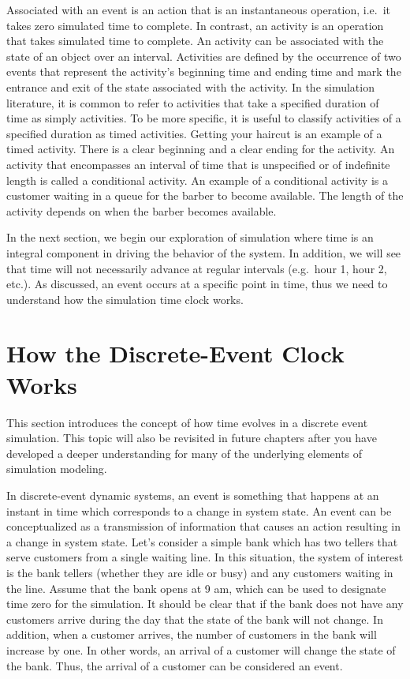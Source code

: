 \documentclass[
]{book}
\theoremstyle{definition}
\theoremstyle{definition}
\theoremstyle{definition}
\theoremstyle{definition}
\theoremstyle{remark}
\begin{document}
Associated with an event is an action that is an instantaneous
operation, i.e.~it takes zero simulated time to complete. In contrast,
an activity is an operation that takes simulated time to complete. An
activity can be associated with the state of an object over an interval.
Activities are defined by the occurrence of two events that represent
the activity's beginning time and ending time and mark the entrance and
exit of the state associated with the activity. In the simulation
literature, it is common to refer to activities that take a specified
duration of time as simply activities. To be more specific, it is useful
to classify activities of a specified duration as timed activities.
Getting your haircut is an example of a timed activity. There is a clear
beginning and a clear ending for the activity. An activity that
encompasses an interval of time that is unspecified or of indefinite
length is called a conditional activity. An example of a conditional
activity is a customer waiting in a queue for the barber to become
available. The length of the activity depends on when the barber becomes
available.

In the next section, we begin our exploration of simulation where time is an
integral component in driving the behavior of the system. In addition,
we will see that time will not necessarily advance at regular intervals
(e.g.~hour 1, hour 2, etc.). As discussed, an event occurs at a specific point in time, thus we need to understand how the simulation time clock works.

\hypertarget{HowDEDSClockWorks}{%
\section{How the Discrete-Event Clock Works}\label{HowDEDSClockWorks}}

This section introduces the concept of how time evolves in a discrete
event simulation. This topic will also be revisited in future chapters
after you have developed a deeper understanding for many of the
underlying elements of simulation modeling.

In discrete-event dynamic systems, an event is something that happens at
an instant in time which corresponds to a change in system state. An
event can be conceptualized as a transmission of information that causes
an action resulting in a change in system state. Let's consider a simple
bank which has two tellers that serve customers from a single waiting
line. In this situation, the system of interest is the bank tellers
(whether they are idle or busy) and any customers waiting in the line.
Assume that the bank opens at 9 am, which can be used to designate time
zero for the simulation. It should be clear that if the bank does not
have any customers arrive during the day that the state of the bank will
not change. In addition, when a customer arrives, the number of
customers in the bank will increase by one. In other words, an arrival
of a customer will change the state of the bank. Thus, the arrival of a
customer can be considered an event.
\end{document}
